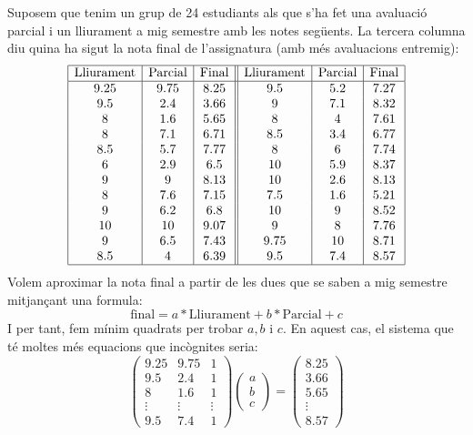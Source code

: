 \begin{exemple}
Suposem que tenim un grup de 24 estudiants als que s'ha fet una avaluació parcial i un lliurament a mig semestre amb les notes següents. La tercera columna diu quina ha sigut la nota final de l'assignatura (amb més avaluacions entremig):
\[
\begin{array}{|c|c|c||c|c|c|}
\hline \text{Lliurament} & \text{Parcial} & \text{Final} & 
\text{Lliurament} & \text{Parcial} & \text{Final}\\ \hline
9.25 & 9.75 & 8.25 & 
9.5 & 5.2 & 7.27 \\
9.5 & 2.4 & 3.66 &
9 & 7.1 & 8.32 \\
8 & 1.6 & 5.65 &
8 & 4 & 7.61 \\
8 & 7.1 & 6.71 &
8.5 & 3.4 & 6.77 \\
8.5 & 5.7 & 7.77 &
8 & 6 & 7.74 \\
6 & 2.9 & 6.5 &
10 & 5.9 & 8.37 \\
9 & 9 & 8.13 &
10 & 2.6 & 8.13 \\
8 & 7.6 & 7.15 &
7.5 & 1.6 & 5.21 \\
9 & 6.2 & 6.8 &
10 & 9 & 8.52 \\
10 & 10 & 9.07 &
9 & 8 & 7.76 \\
9 & 6.5 & 7.43 &
9.75 & 10 & 8.71 \\
8.5 & 4 & 6.39 &
9.5 & 7.4 & 8.57 \\ \hline
\end{array}
\]
Volem aproximar la nota final a partir de les dues que se saben a mig semestre mitjançant una formula:
\[
\text{final} = a * \text{Lliurament} + b * \text{Parcial} + c
\]
I per tant, fem mínim quadrats per trobar $a,b$ i $c$.
En aquest cas, el sistema que té moltes més equacions que incògnites seria:
\[
\begin{pmatrix}
9.25 & 9.75 & 1 \\
9.5 & 2.4 & 1 \\
8 & 1.6 & 1 \\
\vdots & \vdots & \vdots \\
9.5 & 7.4 & 1
\end{pmatrix}
\begin{pmatrix} a \\ b \\ c \end{pmatrix}=
\begin{pmatrix} 8.25 \\ 3.66 \\ 5.65 \\ \vdots \\ 8.57 \end{pmatrix}
\]
\end{exemple}
